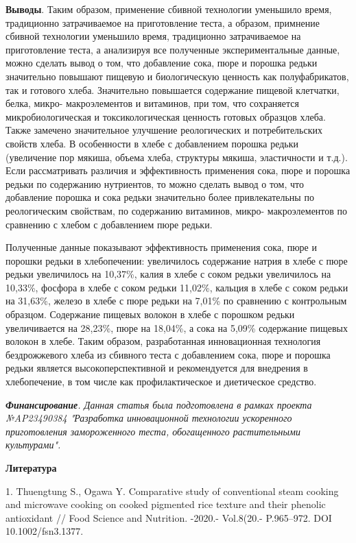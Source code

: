 {\bfseries Выводы}. Таким образом, применение сбивной технологии уменьшило
время, традиционно затрачиваемое на приготовление теста, а образом,
примнение сбивной технологии уменьшило время, традиционно затрачиваемое
на приготовление теста, а анализируя все полученные экспериментальные
данные, можно сделать вывод о том, что добавление сока, пюре и порошка
редьки значительно повышают пищевую и биологическую ценность как
полуфабрикатов, так и готового хлеба. Значительно повышается содержание
пищевой клетчатки, белка, микро- макроэлементов и витаминов, при том,
что сохраняется микробиологическая и токсикологическая ценность готовых
образцов хлеба. Также замечено значительное улучшение реологических и
потребительских свойств хлеба. В особенности в хлебе с добавлением
порошка редьки (увеличение пор мякиша, объема хлеба, структуры мякиша,
эластичности и т.д.). Если рассматривать различия и эффективность
применения сока, пюре и порошка редьки по содержанию нутриентов, то
можно сделать вывод о том, что добавление порошка и сока редьки
значительно более привлекательны по реологическим свойствам, по
содержанию витаминов, микро- макроэлементов по сравнению с хлебом с
добавлением пюре редьки.

Полученные данные показывают эффективность применения сока, пюре и
порошки редьки в хлебопечении: увеличилось содержание натрия в хлебе с
пюре редьки увеличилось на 10,37\%, калия в хлебе с соком редьки
увеличилось на 10,33\%, фосфора в хлебе с соком редьки 11,02\%, кальция
в хлебе с соком редьки на 31,63\%, железо в хлебе с пюре редьки на
7,01\% по сравнению с контрольным образцом. Содержание пищевых волокон в
хлебе с порошком редьки увеличивается на 28,23\%, пюре на 18,04\%, а
сока на 5,09\% содержание пищевых волокон в хлебе. Таким образом,
разработанная инновационная технология бездрожжевого хлеба из сбивного
теста с добавлением сока, пюре и порошка редьки является
высокоперспективной и рекомендуется для внедрения в хлебопечение, в том
числе как профилактическое и диетическое средство.

\emph{{\bfseries Финансирование}. Данная статья была подготовлена в рамках
проекта №AP23490384 "Разработка инновационной технологии ускоренного
приготовления замороженного теста, обогащенного растительными
культурами".}

{\bfseries Литература}

1. Thuengtung S., Ogawa Y. Comparative study of conventional steam
cooking and microwave cooking on cooked pigmented rice texture and their
phenolic antioxidant // Food Science and Nutrition. -2020.- Vol.8(20.-
P.965--972. DOI 10.1002/fsn3.1377.


